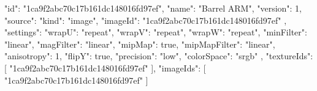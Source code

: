 {
  "id": "1ca9f2abc70c17b161dc148016fd97ef",
  "name": "Barrel ARM",
  "version": 1,
  "source": {
    "kind": "image",
    "imageId": "1ca9f2abc70c17b161dc148016fd97ef"
  },
  "settings": {
    "wrapU": "repeat",
    "wrapV": "repeat",
    "wrapW": "repeat",
    "minFilter": "linear",
    "magFilter": "linear",
    "mipMap": true,
    "mipMapFilter": "linear",
    "anisotropy": 1,
    "flipY": true,
    "precision": "low",
    "colorSpace": "srgb"
  },
  "textureIds": [
    "1ca9f2abc70c17b161dc148016fd97ef"
  ],
  "imageIds": [
    "1ca9f2abc70c17b161dc148016fd97ef"
  ]
}
